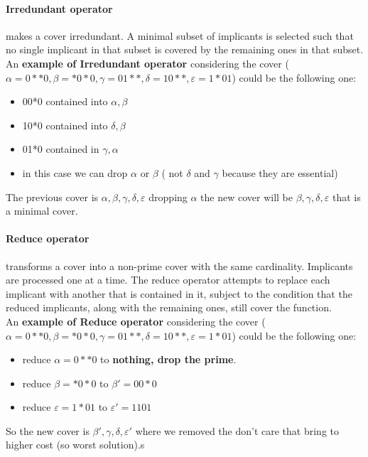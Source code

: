 \paragraph{Irredundant operator} makes a cover irredundant. A minimal subset of implicants is selected such that no single implicant in that subset is covered by the remaining ones in that subset.
\bigskip\\
An \textbf{example of Irredundant operator} considering the cover ($ \alpha=0**0, \beta=*0*0, \gamma=01**, \delta=10**, \varepsilon= 1*01 $) could be the following one:
\begin{itemize}
	\item 00*0 contained into $ \alpha, \beta $
	\item 10*0 contained into $ \delta, \beta $
	\item 01*0 contained in $ \gamma, \alpha $
	\item in this case we can drop $ \alpha $ or $ \beta $ ( not $ \delta $ and $ \gamma $ because they are essential)
\end{itemize}

The previous cover is $ \alpha, \beta, \gamma, \delta, \varepsilon $ dropping $ \alpha $ the new cover will be $ \beta, \gamma, \delta, \varepsilon $ that is a minimal cover.

\paragraph{Reduce operator} transforms a cover into a non-prime cover with the same cardinality. Implicants are processed one at a time. The reduce operator attempts to replace each implicant with another that is contained in it, subject to the condition that
the reduced implicants, along with the remaining ones, still cover the function.
\bigskip\\

An \textbf{example of Reduce operator} considering the cover ($ \alpha=0**0, \beta=*0*0, \gamma=01**, \delta=10**, \varepsilon= 1*01 $) could be the following one:
\begin{itemize}
	\item reduce $ \alpha  = 0**0 $ to \textbf{nothing, drop the prime}.
	\item reduce $ \beta  = *0*0 $ to $ \beta'  = 00*0 $  
	\item reduce $ \varepsilon  = 1*01 $ to $ \varepsilon'  = 1101 $
\end{itemize}

So the new cover is {$ \beta', \gamma, \delta, \varepsilon'$} where we removed the don't care that bring to higher cost (so worst solution).s



